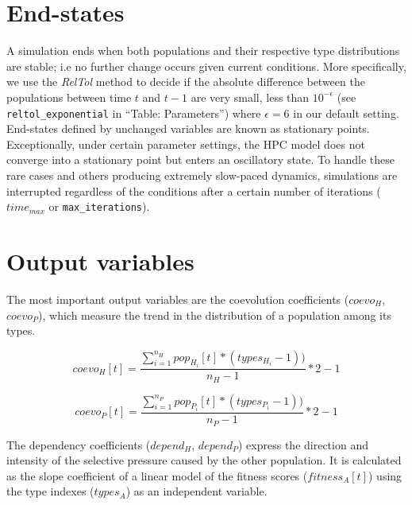 \documentclass[
]{book}
\begin{document}
\newpage

\hypertarget{end-states}{%
\section*{End-states}\label{end-states}}

A simulation ends when both populations and their respective type distributions are stable; i.e no further change occurs given current conditions. More specifically, we use the \emph{RelTol} method to decide if the absolute difference between the populations between time \(t\) and \(t-1\) are very small, less than \(10^{-\epsilon}\) (see \texttt{reltol\_exponential} in ``Table: Parameters'') where \(\epsilon=6\) in our default setting. End-states defined by unchanged variables are known as stationary points. Exceptionally, under certain parameter settings, the HPC model does not converge into a stationary point but enters an oscillatory state. To handle these rare cases and others producing extremely slow-paced dynamics, simulations are interrupted regardless of the conditions after a certain number of iterations (\(time_{max}\) or \texttt{max\_iterations}).

\newpage

\hypertarget{output-variables}{%
\section*{Output variables}\label{output-variables}}

The most important output variables are the coevolution coefficients (\(coevo_H\), \(coevo_P\)), which measure the trend in the distribution of a population among its types.

\begin{equation}
\tag{Eq. 17}
coevo_H[t]=\frac{\sum_{i=1}^{n_H}pop_{H_i}[t] * (types_{H_i} - 1))}{n_H - 1} * 2 - 1
\end{equation}

\begin{equation}
\tag{Eq. 18}
coevo_P[t]=\frac{\sum_{i=1}^{n_P}pop_{P_i}[t] * (types_{P_i} - 1))}{n_P - 1} * 2 - 1
\end{equation}

The dependency coefficients (\(depend_H\), \(depend_P\)) express the direction and intensity of the selective pressure caused by the other population. It is calculated as the slope coefficient of a linear model of the fitness scores (\(fitness_A[t]\)) using the type indexes (\(types_A\)) as an independent variable.
\end{document}
